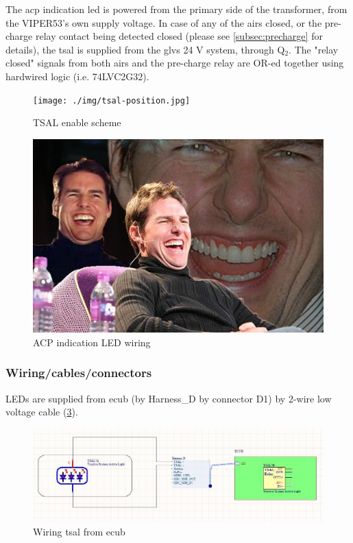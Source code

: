 The \gls{acp} indication led is powered from the primary side of the transformer, from the VIPER53's own supply voltage.
In case of any of the \glspl{air} closed, or the pre-charge relay contact being detected closed (please see \ref{subsec:precharge}  for details), the \gls{tsal} is supplied from the \gls{glvs} 24 V system, through Q$_2$. The "relay closed" signals from both \glspl{air} and the pre-charge relay are OR-ed together using hardwired logic (i.e. 74LVC2G32).

\begin{figure}[H]
	\centering
	\texttt{[image: ./img/tsal-position.jpg]}
	\caption{TSAL enable scheme}
	\label{fig:TSAL-enable}
\end{figure}

\begin{figure}[H]
	\centering
	\includegraphics[width=\textwidth]{./img/tsal-indicator.jpg}
	\caption{ACP indication LED wiring}
	\label{fig:TSAL-ACPindicator}
\end{figure}

\subsubsection{Wiring/cables/connectors}

LEDs are supplied from \gls{ecub} (by Harness\_D by connector D1) by 2-wire low voltage cable (\ref{fig:TSAL-wiring}).

\begin{figure}[H]
	\centering
	\includegraphics[width=\textwidth,]{./img/tsal-wiring.jpg}
	\caption{Wiring \gls{tsal} from \gls{ecub}}
	\label{fig:TSAL-wiring}
\end{figure}

